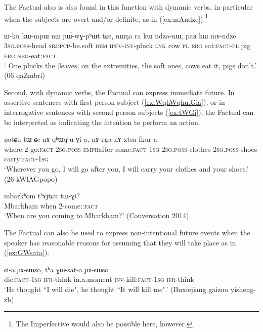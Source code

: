 The Factual also is also found in this function with dynamic verbs, in particular when the subjects are overt and/or definite, as in (\ref{ex:mAndze}).\footnote{The Imperfective would also be possible here, however. }

\begin{exe}
\ex \label{ex:mAndze}
\gll ɯ-ku kɯ-mpɯ nɯ ɲɯ́-wɣ-pʰɯt tɕe, nɯŋa ra kɯ ndza-nɯ, paʁ kɯ mɤ-ndze \\
\textsc{3sg}.\textsc{poss}-head \textsc{sbj}:\textsc{pcp}-be.soft \textsc{dem} \textsc{ipfv}-\textsc{inv}-pluck \textsc{lnk} cow \textsc{pl} \textsc{erg} eat:\textsc{fact}-\textsc{pl} pig \textsc{erg} \textsc{neg}-eat:\textsc{fact} \\
\glt ` One plucks the [leaves] on the extremities, the soft ones, cows eat it, pigs don't.' (06 qaZmbri)
\end{exe}
 
Second, with dynamic verbs, the Factual can express immediate future. In  assertive sentences with first person subject (\ref{ex:WqhWqhu.Gia}), or in interrogative sentences with second person subjects (\ref{ex:tWGi}), the Factual can be interpreted as indicating the intention to perform an action.

\begin{exe}
\ex \label{ex:WqhWqhu.Gia}
\gll ŋotɕu tɯ-ɕe nɤ-qʰɯ\redp{}qʰu ɣi-a, nɤ-ŋga nɤ-xtsa fkur-a \\
where 2-go:\textsc{fact} \textsc{2sg}.\textsc{poss}-\textsc{emph}\redp{}after come:\textsc{fact}-\textsc{1sg} \textsc{2sg}.\textsc{poss}-clothes  \textsc{2sg}.\textsc{poss}-shoes carry:\textsc{fact}-\textsc{1sg} \\
\glt `Wherever you go, I will go after you, I will carry your clothes and your shoes.' (26-kWlAGpopo)
\end{exe}

\begin{exe}
\ex \label{ex:tWGi}
\gll mbarkʰom tʰɤjtɕu tɯ-ɣi? \\
Mbarkham when 2-come::\textsc{fact} \\
\glt `When are you coming to Mbarkham?' (Conversation 2014)
\end{exe}

The Factual can also be used to express non-intentional future events when the speaker has reasonable reasons for assuming that they will take place as in (\ref{ex:GWsata}). 

\begin{exe}
\ex \label{ex:GWsata}
\gll si-a ɲɤ-sɯso, tʰa ɣɯ-sat-a ɲɤ-sɯso \\
die:\textsc{fact}-\textsc{1sg} \textsc{ifr}-think in.a.moment \textsc{inv}-kill:\textsc{fact}-\textsc{1sg} \textsc{ifr}-think \\
\glt `He thought ``I will die", he thought ``It will kill me".' (Buxiejiang gaizuo yisheng-zh)
\end{exe}

